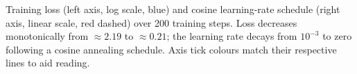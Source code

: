 \caption{Training loss (left axis, log scale, blue) and cosine learning-rate schedule (right axis, linear scale, red dashed) over 200 training steps. Loss decreases monotonically from ${\approx}2.19$ to ${\approx}0.21$; the learning rate decays from $10^{-3}$ to zero following a cosine annealing schedule. Axis tick colours match their respective lines to aid reading.}
